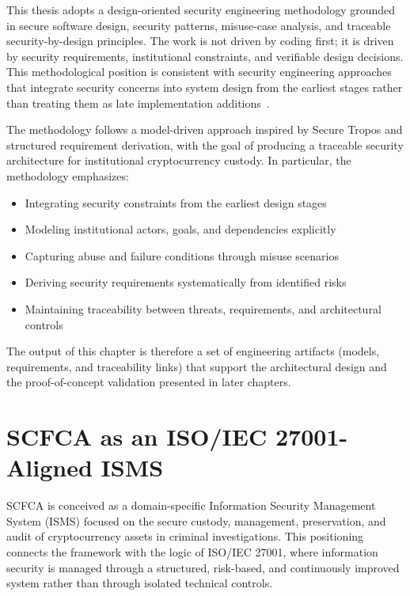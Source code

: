 \documentclass[12pt,a4paper]{report}
\begin{document}
This thesis adopts a design-oriented security engineering methodology grounded in secure software design, security patterns, misuse-case analysis, and traceable security-by-design principles. The work is not driven by coding first; it is driven by security requirements, institutional constraints, and verifiable design decisions. This methodological position is consistent with security engineering approaches that integrate security concerns into system design from the earliest stages rather than treating them as late implementation additions~\cite{Schumacher2006,Fluchs2021}.

The methodology follows a model-driven approach inspired by Secure Tropos and structured requirement derivation, with the goal of producing a traceable security architecture for institutional cryptocurrency custody. In particular, the methodology emphasizes:

\begin{itemize}
    \item Integrating security constraints from the earliest design stages
    \item Modeling institutional actors, goals, and dependencies explicitly
    \item Capturing abuse and failure conditions through misuse scenarios
    \item Deriving security requirements systematically from identified risks
    \item Maintaining traceability between threats, requirements, and architectural controls
\end{itemize}

The output of this chapter is therefore a set of engineering artifacts (models, requirements, and traceability links) that support the architectural design and the proof-of-concept validation presented in later chapters.

\section{SCFCA as an ISO/IEC 27001-Aligned ISMS}

SCFCA is conceived as a domain-specific Information Security Management System (ISMS) focused on the secure custody, management, preservation, and audit of cryptocurrency assets in criminal investigations. This positioning connects the framework with the logic of ISO/IEC 27001, where information security is managed through a structured, risk-based, and continuously improved system rather than through isolated technical controls.
\end{document}
